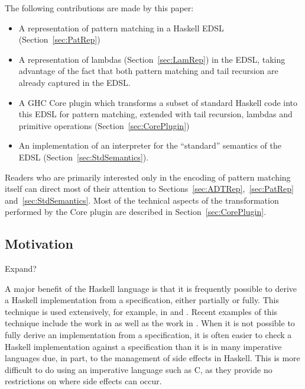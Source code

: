 \documentclass[runningheads, a4paper]{llncs}
\newenvironment{todont}
               {\comment}
               {\endcomment}
\begin{document}
The following contributions are made by this paper:

\begin{itemize}
  \item A representation of pattern matching in a Haskell EDSL (Section~\ref{sec:PatRep})
  \item A representation of lambdas (Section~\ref{sec:LamRep}) in the EDSL, taking advantage of
  the fact that both pattern matching and tail recursion are already captured in
  the EDSL.
  \item A GHC Core plugin which transforms a subset of standard Haskell code
  into this EDSL for pattern matching, extended with tail recursion,
  lambdas and primitive operations (Section~\ref{sec:CorePlugin})
  \item An implementation of an interpreter for the ``standard'' semantics of the EDSL (Section~\ref{sec:StdSemantics}).
\end{itemize}


Readers who are primarily interested only in the encoding of pattern matching itself can direct
most of their attention to Sections~\ref{sec:ADTRep},~\ref{sec:PatRep} and~\ref{sec:StdSemantics}. Most of the technical aspects of
the transformation performed by the Core plugin are described in Section~\ref{sec:CorePlugin}.

\subsection{Motivation}

\begin{todont}
  Expand?
\end{todont}

A major benefit of the Haskell language is that it is frequently possible to derive
a Haskell implementation from a specification, either partially or fully.  This
technique is used extensively, for example, in \cite{Bird:2010:Pearls} and
\cite{Gibbons:2002:Calc}.  Recent examples of this technique include the work in
\cite{Elliott-2018-ad-icfp} as well as the work in
\cite{Elliott2019-convolution-extended}.  When it is not possible to fully
derive an implementation from a specification, it is often easier to check a
Haskell implementation against a specification than it is in many imperative
languages due, in part, to the management of side effects in Haskell. This is
more difficult to do using an imperative language such as C, as they provide no
restrictions on where side effects can occur.
\end{document}
